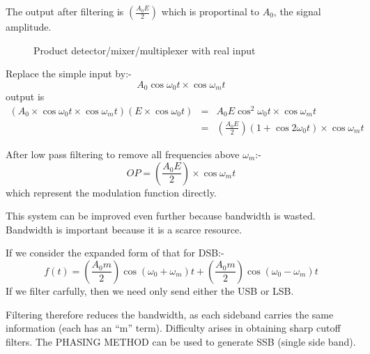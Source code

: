 \documentclass[11pt]{article} %
\begin{document}
	The output after filtering is $\left(\frac{A_0E}{2}\right)$ which is proportinal to $A_0$, the signal amplitude.
	\begin{figure}[h]
		\centering
		\caption{Product detector/mixer/multiplexer with real input}
	\end{figure}

	Replace the simple input by:-
	\begin{equation}
		A_0\cos{\omega_0 t} \times \cos{\omega_m t}
	\end{equation}
	output is
	\begin{eqnarray}
		(A_0 \times \cos{\omega_0t} \times \cos{\omega_m t})(E\times\cos{\omega_0 t})
		&=& A_0 E \cos^2{\omega_0 t}\times\cos{\omega_m t} \\
		&=& \left(\frac{A_0 E}{2}\right)(1+\cos{2 \omega_0 t}) \times \cos{\omega_m t}
	\end{eqnarray}

	After low pass filtering to remove all frequencies above $\omega_m$:-
	\begin{equation}
		OP = \left(\frac{A_0 E}{2}\right) \times \cos{\omega_m t}
	\end{equation}which represent the modulation function directly.

	This system can be improved even further because bandwidth is wasted. Bandwidth is important because it is a scarce resource.

	If we consider the expanded form of that for DSB:-
	\begin{equation}
		f(t) = \left(\frac{A_0m}{2} \right) \cos{\left(\omega_0 + \omega_m\right)}t + \left(\frac{A_0m}{2} \right)  \cos{\left(\omega_0 - \omega_m\right)}t 
	\end{equation}
	If we filter carfully, then we need only send either the USB or LSB.


	Filtering therefore reduces the bandwidth, as each sideband carries the same information (each has an ``m'' term). Difficulty arises in obtaining sharp cutoff filters. The PHASING METHOD can be used to generate SSB (single side band).
\end{document}
